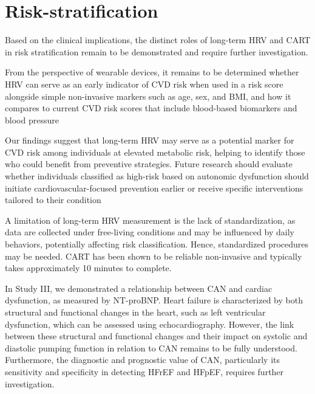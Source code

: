\documentclass[
  a4paper,
  headsepline=true,
  open=any]{scrbook}
\begin{document}
\hypertarget{risk-stratification-1}{%
\section{Risk-stratification}\label{risk-stratification-1}}

Based on the clinical implications, the distinct roles of long-term HRV
and CART in risk stratification remain to be demonstrated and require
further investigation.

From the perspective of wearable devices, it remains to be determined
whether HRV can serve as an early indicator of CVD risk when used in a
risk score alongside simple non-invasive markers such as age, sex, and
BMI, and how it compares to current CVD risk scores that include
blood-based biomarkers and blood pressure

Our findings suggest that long-term HRV may serve as a potential marker
for CVD risk among individuals at elevated metabolic risk, helping to
identify those who could benefit from preventive strategies. Future
research should evaluate whether individuals classified as high-risk
based on autonomic dysfunction should initiate cardiovascular-focused
prevention earlier or receive specific interventions tailored to their
condition

A limitation of long-term HRV measurement is the lack of
standardization, as data are collected under free-living conditions and
may be influenced by daily behaviors, potentially affecting risk
classification. Hence, standardized procedures may be needed. CART has
been shown to be reliable non-invasive and typically takes approximately
10 minutes to complete.

In Study III, we demonstrated a relationship between CAN and cardiac
dysfunction, as measured by NT-proBNP. Heart failure is characterized by
both structural and functional changes in the heart, such as left
ventricular dysfunction, which can be assessed using echocardiography.
However, the link between these structural and functional changes and
their impact on systolic and diastolic pumping function in relation to
CAN remains to be fully understood. Furthermore, the diagnostic and
prognostic value of CAN, particularly its sensitivity and specificity in
detecting HFrEF and HFpEF, requires further investigation.
\end{document}
